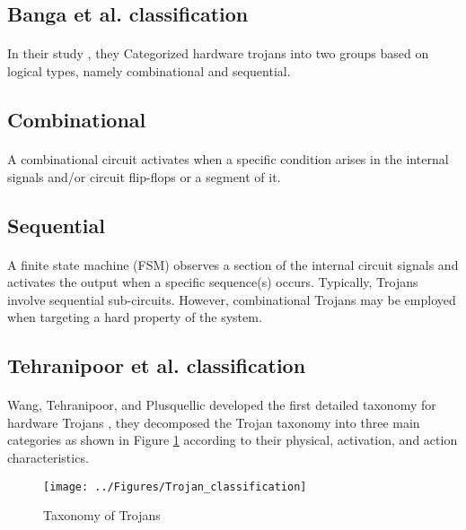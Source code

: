 \subsection{Banga et al. classification}
\paragraph*{}
In their study \cite{4559047a}, they Categorized hardware trojans into two groups based on logical types, namely combinational and sequential.
\subsection*{Combinational}
\paragraph*{}
A combinational circuit activates when a specific condition arises in the internal signals and/or circuit flip-flops or a segment of it.
\subsection*{Sequential}
\paragraph*{}
A finite state machine (FSM) observes a section of the internal circuit signals and activates the output when a specific sequence(s) occurs. Typically, Trojans involve sequential sub-circuits. However, combinational Trojans may be employed when targeting a hard property of the system.
\subsection{Tehranipoor et al. classification}
\paragraph*{}
Wang, Tehranipoor, and Plusquellic developed the first detailed taxonomy for hardware Trojans \cite{wang2008detecting}, they decomposed the Trojan taxonomy into three main categories as shown in Figure \ref{fig:trojanclassification} according to their physical, activation, and action characteristics.
\begin{figure}[h]
	\centering
	\texttt{[image: ../Figures/Trojan\_classification]}
	\caption{Taxonomy of Trojans}
	\label{fig:trojanclassification}
\end{figure}
\pagebreak
